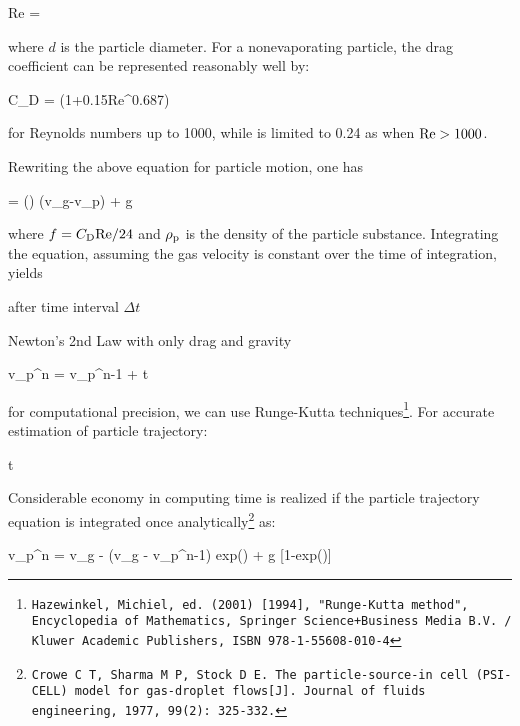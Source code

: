 %
\be
    {\rm Re}
    = 
  \label{eq_relativevelocity}
\ee
%

where $d$ is the particle diameter. For a nonevaporating particle, the drag coefficient can be represented reasonably well by:

%
\be
    {C_{\rm D}}
    =  (1+0.15{{\rm Re}^{0.687}})
  \label{eq_dragcoefficient}
\ee
%

for Reynolds numbers up to 1000, while is limited to 0.24 as when ${\rm Re}>1000$.


Rewriting the above equation for particle motion, one has

%
\be
    = () ({v_{\rm g}}-{v_{\rm p}})
    + {\rm g}
  \label{eq_motionrewrite}
\ee
%

where $f={C_{\rm D}} {\rm Re} / 24$ and $\rho_{\rm p}$ is the density of the particle substance.
Integrating the equation, assuming the gas velocity is constant over the time of integration, yields

after time interval $\Delta t$

Newton's 2nd Law with only drag and gravity

%
\be
    {v_{\rm p}^n}
    = {v_{\rm p}^{n-1}} +  {\Delta t}
  \label{eq_updatevelocity}
\ee
%

for computational precision, we can use Runge-Kutta techniques\footnote{\tt Hazewinkel, Michiel, ed. (2001) [1994], "Runge-Kutta method", Encyclopedia of Mathematics, Springer Science+Business Media B.V. / Kluwer Academic Publishers, ISBN 978-1-55608-010-4}.
For accurate estimation of particle trajectory:

%
\be
    {\Delta t} \leqslant {}
  \label{eq_RungeKuttanewvelocity}
\ee
%

Considerable economy in computing time is realized if the particle trajectory equation is integrated once analytically\footnote{\tt Crowe C T, Sharma M P, Stock D E. The particle-source-in cell (PSI-CELL) model for gas-droplet flows[J]. Journal of fluids engineering, 1977, 99(2): 325-332.} as:

%
\be
    {v_{\rm p}^n}
    = {v_{\rm g}} - ({v_{\rm g}} - {v_{\rm p}^{n-1}}) {\rm exp}()
    + {\rm g} {\tau} [1-{\rm exp}()]
  \label{eq_integratnewvelocity}
\ee
%

